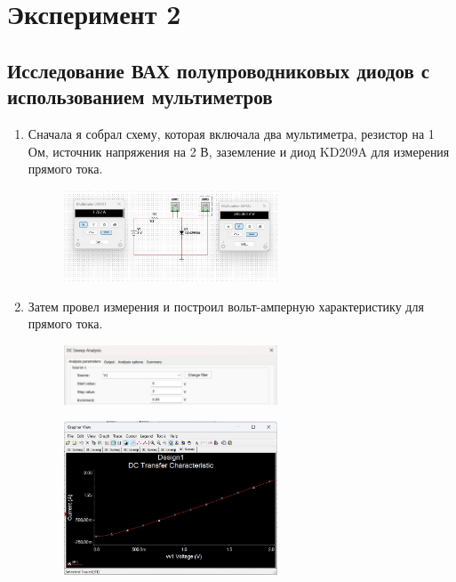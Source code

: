 \chapter{Эксперимент 2}

\section*{Исследование ВАХ полупроводниковых диодов с использованием мультиметров}

\begin{enumerate}
	\item Сначала я собрал схему, которая включала два мультиметра, резистор на 1 Ом, источник напряжения на 2 В, заземление и диод KD209A для измерения прямого тока.
	\begin{figure}[H]
		\centering
		\includegraphics[width=0.6\textwidth]{img/11.jpg}
	\end{figure}
	\item Затем провел измерения и построил вольт-амперную характеристику для прямого тока.
	\begin{figure}[H]
		\centering
		\includegraphics[width=0.6\textwidth]{img/dop_01.jpg}
	\end{figure}
	\begin{figure}[H]
		\centering
		\includegraphics[width=0.6\textwidth]{img/12.jpg}
	\end{figure}

\end{enumerate}
